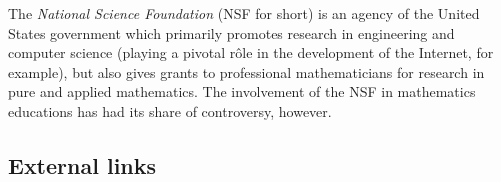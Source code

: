 \documentclass[12pt]{article}
\begin{document}

The {\em National Science Foundation} (NSF for short) is an agency of the United States government which primarily promotes research in engineering and computer science (playing a pivotal r\^ole in the development of the Internet, for example), but also gives grants to professional mathematicians for research in pure and applied mathematics. The involvement of the NSF in mathematics educations has had its share of controversy, however.

\subsection{External links}

\end{document}
